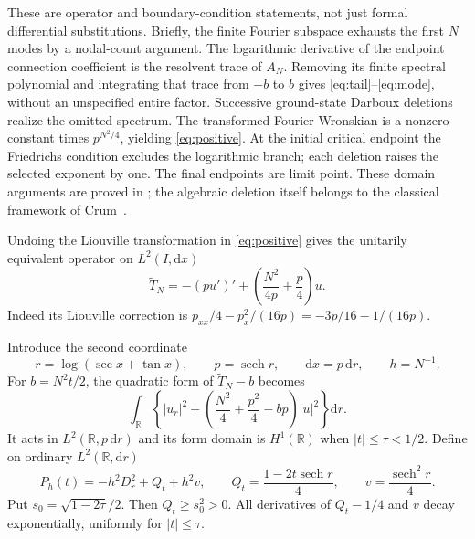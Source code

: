 \documentclass[10pt]{article}
\newcommand{\dd}{\mathrm d}
\newcommand{\sech}{\operatorname{sech}}
\newcommand{\RR}{\mathbb R}
\begin{document}
These are operator and boundary-condition statements, not just formal
differential substitutions. Briefly, the finite Fourier subspace
exhausts the first $N$ modes by a nodal-count argument.
The logarithmic derivative of the endpoint connection coefficient is
the resolvent trace of $A_N$. Removing its finite spectral polynomial
and integrating that trace from $-b$ to $b$ gives \eqref{eq:tail}--\eqref{eq:mode},
without an unspecified entire factor. Successive ground-state
Darboux deletions realize the omitted spectrum. The transformed
Fourier Wronskian is a nonzero constant times $p^{N^2/4}$, yielding
\eqref{eq:positive}. At the initial critical endpoint the
Friedrichs condition excludes the logarithmic branch; each deletion
raises the selected exponent by one. The final endpoints are limit
point. These domain arguments are proved in \cite{tails,moments};
the algebraic deletion itself belongs to the classical framework
of Crum~\cite{crum}.

Undoing the Liouville transformation in \eqref{eq:positive} gives
the unitarily equivalent operator on $L^2(I,\dd x)$
\begin{equation}
\widetilde T_N=-(p u')'+\left(\frac{N^2}{4p}+\frac p4\right)u.
\label{eq:tilde}
\end{equation}
Indeed its Liouville correction is
$p_{xx}/4-p_x^2/(16p)=-3p/16-1/(16p)$.

Introduce the second coordinate
\begin{equation}
r=\log(\sec x+\tan x),\qquad p=\sech r,\qquad \dd x=p\,\dd r,
\qquad h=N^{-1}.
\label{eq:coordinate}
\end{equation}
For $b=N^2t/2$, the quadratic form of $\widetilde T_N-b$ becomes
\begin{equation}
\int_{\RR}\left\{|u_r|^2+
 \left(\frac{N^2}4+\frac{p^2}4-bp\right)|u|^2\right\}\dd r.
\label{eq:form}
\end{equation}
It acts in $L^2(\RR,p\,\dd r)$ and its form domain is $H^1(\RR)$
when $|t|\le\tau<1/2$. Define on ordinary $L^2(\RR,\dd r)$
\begin{equation}
P_h(t)=-h^2D_r^2+Q_t+h^2v,\qquad
Q_t=\frac{1-2t\sech r}{4},\qquad v=\frac{\sech^2r}{4}.
\label{eq:wholeline}
\end{equation}
Put $s_0=\sqrt{1-2\tau}/2$. Then $Q_t\ge s_0^2>0$.
All derivatives of $Q_t-1/4$ and $v$ decay exponentially, uniformly
for $|t|\le\tau$.
\end{document}
